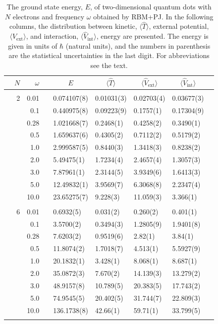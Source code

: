 \begin{table}[H]
	\caption{The ground state energy, $E$, of two-dimensional quantum dots with $N$ electrons and frequency $\omega$ obtained by RBM+PJ. In the following columns, the distribution between kinetic, $\langle\hat{T}\rangle$, external potential, $\langle\hat{V}_{\text{ext}}\rangle$, and interaction, $\langle\hat{V}_{\text{int}}\rangle$, energy are presented. The energy is given in units of $\hbar$ (natural units), and the numbers in parenthesis are the statistical uncertainties in the last digit. For abbreviations see the text.}
	\label{tab:splitfrequencyQDRBMPJ}
	\begin{tabularx}{\textwidth}{R{1cm}rrcR{2.3cm}R{2.3cm}R{2.3cm}R{2.3cm}R{1cm}} \hline\hline
		\makecell{\\ \phantom{$N$}} & $N$ & $\omega$ &&  &  &  &  & \\ \hline \\
		&2 & 0.01 && 0.074107(8) & 0.01031(3) & 0.02703(4) & 0.03677(3) \\
		&& 0.1 && 0.440975(8) & 0.09223(9) & 0.1757(1) & 0.17304(9) \\
		&& 0.28 && 1.021668(7) & 0.2468(1) & 0.4258(2) & 0.3490(1) \\
		&& 0.5 && 1.659637(6) & 0.4305(2) & 0.7112(2) & 0.5179(2) \\
		&& 1.0 && 2.999587(5) & 0.8440(3) & 1.3418(3) & 0.8238(2) \\
		&& 2.0 && 5.49475(1) & 1.7234(4) & 2.4657(4) & 1.3057(3) \\
		&& 3.0 && 7.87961(1) & 2.3144(5) & 3.9349(6) & 1.6413(3) \\
		&& 5.0 && 12.49832(1) & 3.9569(7) & 6.3068(8) & 2.2347(4) \\
		&& 10.0 && 23.65275(7) & 9.228(3) & 11.059(3) & 3.366(1) \\
		\hline \\
		
		&6 & 0.01 && 0.6932(5) & 0.031(2) & 0.260(2) & 0.401(1) \\
		&& 0.1 && 3.5700(2) & 0.3494(3) & 1.2805(9) & 1.9401(8) \\
		&& 0.28 && 7.6203(2) & 0.9519(6) & 2.82(1) & 3.84(1) \\
		&& 0.5 && 11.8074(2) & 1.7018(7) & 4.513(1) & 5.5927(9) \\
		&& 1.0 && 20.1832(1) & 3.428(1) & 8.068(1) & 8.687(1) \\
		&& 2.0 && 35.0872(3) & 7.670(2) & 14.139(3) & 13.279(2) \\
		&& 3.0 && 48.9157(8) & 10.789(5) & 20.383(5) & 17.743(2) \\ 
		&& 5.0 && 74.9545(5) & 20.402(5) & 31.744(7) & 22.809(3) \\
		&& 10.0 && 136.1738(8) & 42.66(1) & 59.71(1) & 33.799(5) \\
		\hline \\
		

\end{tabularx}
\end{table}
